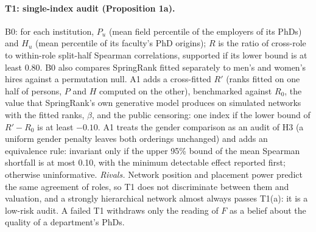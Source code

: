 \paragraph{T1: single-index audit (Proposition 1a).} B0: for each institution, $P_u$ (mean field percentile of the
employers of its PhDs) and $H_u$ (mean percentile of its faculty's PhD origins); $R$ is the ratio of cross-role to
within-role split-half Spearman correlations, supported if its lower bound is at least 0.80. B0 also compares
SpringRank fitted separately to men's and women's hires against a permutation null. A1 adds a cross-fitted $R'$
(ranks fitted on one half of persons, $P$ and $H$ computed on the other), benchmarked against $R_0$, the value that
SpringRank's own generative model produces on simulated networks with the fitted ranks, $\beta$, and the public
censoring: one index if the lower bound of $R'-R_0$ is at least $-0.10$. A1 treats the gender comparison as an audit
of H3 (a uniform gender penalty leaves both orderings unchanged) and adds an equivalence rule: invariant only if the
upper 95\% bound of the mean Spearman shortfall is at most 0.10, with the minimum detectable effect reported
first; otherwise uninformative. \emph{Rivals.} Network position and placement power predict the same agreement of
roles, so T1 does not discriminate between them and valuation, and a strongly hierarchical network almost always
passes T1(a): it is a low-risk audit. A failed T1 withdraws only the reading of $F$ as a
belief about the quality of a department's PhDs.

